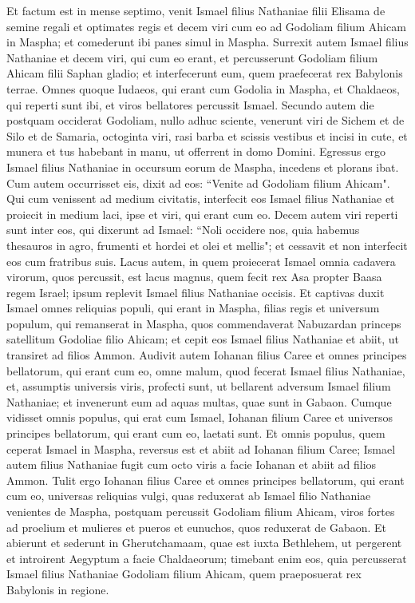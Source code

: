 \begin{biblechapter}  
\verse Et factum est in mense septimo, venit Ismael filius Nathaniae filii Elisama de semine regali et optimates regis et decem viri cum eo ad Godoliam filium Ahicam in Maspha; et comederunt ibi panes simul in Maspha. 
\verse Surrexit autem Ismael filius Nathaniae et decem viri, qui cum eo erant, et percusserunt Godoliam filium Ahicam filii Saphan gladio; et interfecerunt eum, quem praefecerat rex Babylonis terrae. 
\verse Omnes quoque Iudaeos, qui erant cum Godolia in Maspha, et Chaldaeos, qui reperti sunt ibi, et viros bellatores percussit Ismael. 
\verse Secundo autem die postquam occiderat Godoliam, nullo adhuc sciente, 
\verse venerunt viri de Sichem et de Silo et de Samaria, octoginta viri, rasi barba et scissis vestibus et incisi in cute, et munera et tus habebant in manu, ut offerrent in domo Domini. 
\verse Egressus ergo Ismael filius Nathaniae in occursum eorum de Maspha, incedens et plorans ibat. Cum autem occurrisset eis, dixit ad eos: “Venite ad Godoliam filium Ahicam". 
\verse Qui cum venissent ad medium civitatis, interfecit eos Ismael filius Nathaniae et proiecit in medium laci, ipse et viri, qui erant cum eo. 
\verse Decem autem viri reperti sunt inter eos, qui dixerunt ad Ismael: “Noli occidere nos, quia habemus thesauros in agro, frumenti et hordei et olei et mellis"; et cessavit et non interfecit eos cum fratribus suis. 
\verse Lacus autem, in quem proiecerat Ismael omnia cadavera virorum, quos percussit, est lacus magnus, quem fecit rex Asa propter Baasa regem Israel; ipsum replevit Ismael filius Nathaniae occisis. 
\verse Et captivas duxit Ismael omnes reliquias populi, qui erant in Maspha, filias regis et universum populum, qui remanserat in Maspha, quos commendaverat Nabuzardan princeps satellitum Godoliae filio Ahicam; et cepit eos Ismael filius Nathaniae et abiit, ut transiret ad filios Ammon. 
\verse Audivit autem Iohanan filius Caree et omnes principes bellatorum, qui erant cum eo, omne malum, quod fecerat Ismael filius Nathaniae, 
\verse et, assumptis universis viris, profecti sunt, ut bellarent adversum Ismael filium Nathaniae; et invenerunt eum ad aquas multas, quae sunt in Gabaon. 
\verse Cumque vidisset omnis populus, qui erat cum Ismael, Iohanan filium Caree et universos principes bellatorum, qui erant cum eo, laetati sunt. 
\verse Et omnis populus, quem ceperat Ismael in Maspha, reversus est et abiit ad Iohanan filium Caree; 
\verse Ismael autem filius Nathaniae fugit cum octo viris a facie Iohanan et abiit ad filios Ammon. 
\verse Tulit ergo Iohanan filius Caree et omnes principes bellatorum, qui erant cum eo, universas reliquias vulgi, quas reduxerat ab Ismael filio Nathaniae venientes de Maspha, postquam percussit Godoliam filium Ahicam, viros fortes ad proelium et mulieres et pueros et eunuchos, quos reduxerat de Gabaon. 
\verse Et abierunt et sederunt in Gherutchamaam, quae est iuxta Bethlehem, ut pergerent et introirent Aegyptum 
\verse a facie Chaldaeorum; timebant enim eos, quia percusserat Ismael filius Nathaniae Godoliam filium Ahicam, quem praeposuerat rex Babylonis in regione. 
\end{biblechapter}

